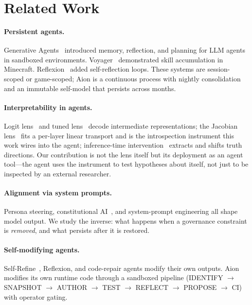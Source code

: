 \documentclass[11pt,a4paper]{article}
\begin{document}
\section{Related Work}

\paragraph{Persistent agents.} Generative Agents~\cite{park2023generative} introduced memory, reflection, and planning for LLM agents in sandboxed environments. Voyager~\cite{wang2023voyager} demonstrated skill accumulation in Minecraft. Reflexion~\cite{shinn2023reflexion} added self-reflection loops. These systems are session-scoped or game-scoped; Aion is a continuous process with nightly consolidation and an immutable self-model that persists across months.

\paragraph{Interpretability in agents.} Logit lens~\cite{nostalgebraist2020} and tuned lens~\cite{belrose2023tuned} decode intermediate representations; the Jacobian lens~\cite{jacobianlens2026} fits a per-layer linear transport and is the introspection instrument this work wires into the agent; inference-time intervention~\cite{li2024inference} extracts and shifts truth directions. Our contribution is not the lens itself but its deployment as an agent tool---the agent uses the instrument to test hypotheses about itself, not just to be inspected by an external researcher.

\paragraph{Alignment via system prompts.} Persona steering, constitutional AI~\cite{bai2022constitutional}, and system-prompt engineering all shape model output. We study the inverse: what happens when a governance constraint is \emph{removed}, and what persists after it is restored.

\paragraph{Self-modifying agents.} Self-Refine~\cite{madaan2023selfrefine}, Reflexion, and code-repair agents modify their own outputs. Aion modifies its own runtime code through a sandboxed pipeline (IDENTIFY $\to$ SNAPSHOT $\to$ AUTHOR $\to$ TEST $\to$ REFLECT $\to$ PROPOSE $\to$ CI) with operator gating.
\end{document}
